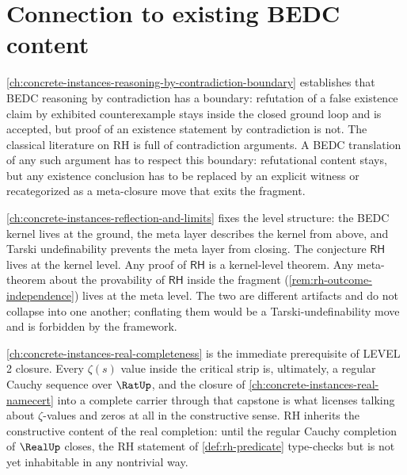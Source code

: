 \section{Connection to existing BEDC content}
\label{sec:rh-connections}

\begin{remark}
\label{rem:rh-reasoning-by-contradiction}
\autoref{ch:concrete-instances-reasoning-by-contradiction-boundary} establishes that BEDC reasoning by contradiction has a boundary: refutation of a false existence claim by exhibited counterexample stays inside the closed ground loop and is accepted, but proof of an existence statement by contradiction is not. The classical literature on RH is full of contradiction arguments. A BEDC translation of any such argument has to respect this boundary: refutational content stays, but any existence conclusion has to be replaced by an explicit witness or recategorized as a meta-closure move that exits the fragment.
\end{remark}

\begin{remark}
\label{rem:rh-reflection}
\autoref{ch:concrete-instances-reflection-and-limits} fixes the level structure: the BEDC kernel lives at the ground, the meta layer describes the kernel from above, and Tarski undefinability prevents the meta layer from closing. The conjecture $\mathsf{RH}$ lives at the kernel level. Any proof of $\mathsf{RH}$ is a kernel-level theorem. Any meta-theorem about the provability of $\mathsf{RH}$ inside the fragment (\autoref{rem:rh-outcome-independence}) lives at the meta level. The two are different artifacts and do not collapse into one another; conflating them would be a Tarski-undefinability move and is forbidden by the framework.
\end{remark}

\begin{remark}
\label{rem:rh-real-completeness}
\autoref{ch:concrete-instances-real-completeness} is the immediate prerequisite of LEVEL 2 closure. Every $\zeta(s)$ value inside the critical strip is, ultimately, a regular Cauchy sequence over $\RatUp$, and the closure of \autoref{ch:concrete-instances-real-namecert} into a complete carrier through that capstone is what licenses talking about $\zeta$-values and zeros at all in the constructive sense. RH inherits the constructive content of the real completion: until the regular Cauchy completion of $\RealUp$ closes, the RH statement of \autoref{def:rh-predicate} type-checks but is not yet inhabitable in any nontrivial way.
\end{remark}

